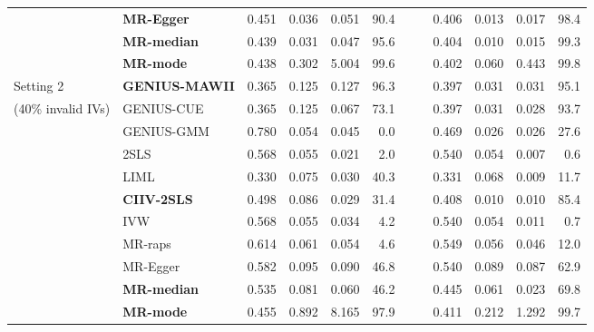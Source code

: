 \documentclass[12pt]{article}
\begin{document}
{\begin{table}[ht]
{\begin{tabular}{llcrrrrlrrrr}
           & \textbf{MR-Egger}     & 0.451  & 0.036 & 0.051  & 90.4 &  &             & 0.406  & 0.013 & 0.017 & 98.4 \\
           & \textbf{MR-median}    & 0.439  & 0.031 & 0.047  & 95.6 &  &             & 0.404  & 0.010 & 0.015 & 99.3 \\
           &\textbf{MR-mode}      & 0.438  & 0.302 & 5.004  & 99.6 &  &             & 0.402  & 0.060 & 0.443 & 99.8 \\ \hline 
Setting 2      & \textbf{GENIUS-MAWII} & 0.365  & 0.125 & 0.127  & 96.3  &  &       & 0.397  & 0.031 & 0.031 & 95.1 \\
{\small(40\% invalid IVs)} & GENIUS-CUE   & 0.365  & 0.125 & 0.067  & 73.1  &  &  & 0.397  & 0.031 & 0.028 & 93.7 \\
           & GENIUS-GMM   & 0.780  & 0.054 & 0.045  & 0.0   &  &             & 0.469  & 0.026 & 0.026 & 27.6 \\
           & 2SLS         & 0.568  & 0.055 & 0.021  & 2.0   &  &             & 0.540  & 0.054 & 0.007 & 0.6  \\
           & LIML         & 0.330  & 0.075 & 0.030  & 40.3  &  &             & 0.331  & 0.068 & 0.009 & 11.7 \\
           & \textbf{CIIV-2SLS}     & 0.498	&0.086	&	0.029	&31.4		&&&	0.408&	0.010	&0.010	&85.4\\
           & IVW          & 0.568  & 0.055 & 0.034  & 4.2   &  &             & 0.540  & 0.054 & 0.011 & 0.7  \\
           & MR-raps      & 0.614  & 0.061 & 0.054  & 4.6   &  &             & 0.549  & 0.056 & 0.046 & 12.0 \\
           & MR-Egger     & 0.582  & 0.095 & 0.090  & 46.8  &  &             & 0.540  & 0.089 & 0.087 & 62.9 \\
           & \textbf{MR-median}    & 0.535  & 0.081 & 0.060  & 46.2  &  &             & 0.445  & 0.061 & 0.023 & 69.8 \\
           & \textbf{MR-mode}      & 0.455  & 0.892 & 8.165  & 97.9  &  &             & 0.411  & 0.212 & 1.292 & 99.7 \\ \hline 

\end{tabular}}
\end{table}}
\end{document}
